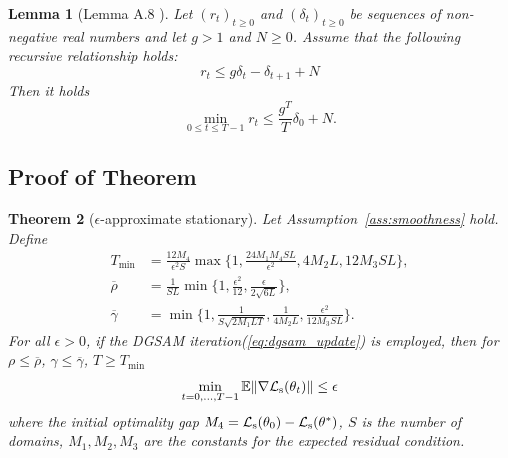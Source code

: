 \documentclass{article}
\theoremstyle{plain}
\newtheorem{theorem}{Theorem}[section]
\newtheorem{lemma}[theorem]{Lemma}
\theoremstyle{definition}
\theoremstyle{remark}
\newcommand{\no}[1]{{\left\lVert #1 \right\rVert}}
\begin{document}
\begin{lemma}[Lemma A.8 \cite{oikonomou2025sam_convergence}]\label{lem:delta-N}
    Let \( (r_t)_{t \geq 0} \) and \( (\delta_t)_{t \geq 0} \) be sequences of non-negative real numbers and let \( g > 1 \) and \( N \geq 0 \). Assume that the following recursive relationship holds:
\begin{equation}
    r_t \leq g \delta_t - \delta_{t+1} + N
\end{equation}
Then it holds
\[
\min_{0 \leq t \leq T-1} r_t \leq \frac{g^T}{T} \delta_0 + N.
\]
\end{lemma}

\subsection{Proof of Theorem}
\begin{theorem}[\(\epsilon\)-approximate stationary]\label{thm:stationary}
    Let Assumption~\ref{ass:smoothness} hold. Define 
    \begin{align*}
        T_{\min}&= \frac{12M_4}{\epsilon^2S}\max\{1,\frac{24M_1M_4SL}{\epsilon^2},4M_2L,12M_3SL\},\\
        \overline{\rho}&=\frac{1}{SL}\min\{1,\frac{\epsilon^2}{12},\frac{\epsilon}{2\sqrt{6L}}\},\\
        \overline{\gamma}&=\min\{1,\frac{1}{S\sqrt{2M_1LT}},\frac{1}{4M_2L},\frac{\epsilon^2}{12M_3SL}\}.
    \end{align*}
    For all \(\epsilon > 0\), if the DGSAM iteration(\ref{eq:dgsam_update}) is employed, then for \(\rho\leq \overline{\rho}\), \(\gamma\leq\overline{\gamma}\), $T\geq T_{\min}$
    \[
     \min_{t=0,\dots,T-1} \E\no{\nabla\gL_{\text{s}}(\theta_t)} \leq \epsilon
    \]
    where the initial optimality gap \(M_4 = {\mathcal{L}}_{\text{s}}(\theta_0)-{\mathcal{L}}_{\text{s}}(\theta^*)\), \(S\) is the number of domains, \(M_1,M_2,M_3\) are the constants for the expected residual condition. 
\end{theorem}
\end{document}
